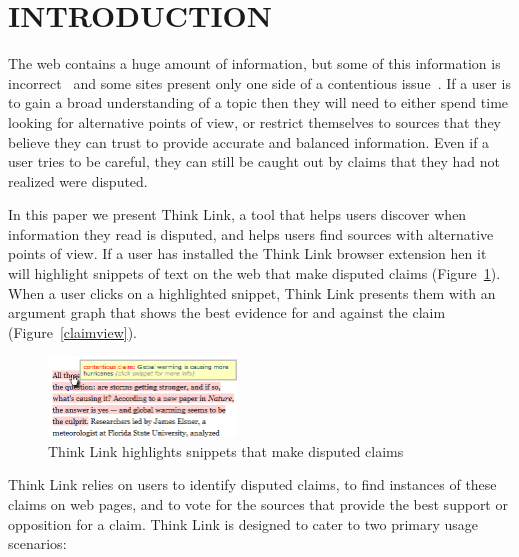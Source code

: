 \documentclass{chi2009}
\newcommand{\todo}[1]{}
\begin{document}




\section{INTRODUCTION}

\todo{update screenshots}

The web contains a huge amount of information, but some of this information is incorrect~\cite{Neumann2003,Resnik1998,Zhou2004} and some sites present only one side of a contentious issue~\cite{Herman2002}. 
If a user is to gain a broad understanding of a topic then they will need to either spend time looking for alternative points of view, or restrict themselves to sources that they believe they can trust to provide accurate and balanced information.
Even if a user tries to be careful, they can still be caught out by claims that they had not realized were disputed.
\todo{word this better}\todo{update all screenshots}

In this paper we present Think Link, a tool that helps users discover when information they read is disputed, and helps users find sources with alternative points of view. If a user has installed the Think Link browser extension hen it will highlight snippets of text on the web that make disputed claims (Figure~\ref{highlight}). When a user clicks on a highlighted snippet, Think Link presents them with an argument graph that shows the best evidence for and against the claim (Figure~\ref{claimview}). 

\begin{figure}[tb]
	\begin{center}
	\includegraphics[width=5cm]{../screenshots/highlight_crop.png}
	\caption{Think Link highlights snippets that make disputed claims}
	\label{highlight}
	\end{center}
\end{figure}

Think Link relies on users to identify disputed claims, to find instances of these claims on web pages, and to vote for the sources that provide the best support or opposition for a claim. 
Think Link is designed to cater to two primary usage scenarios:
\end{document}
